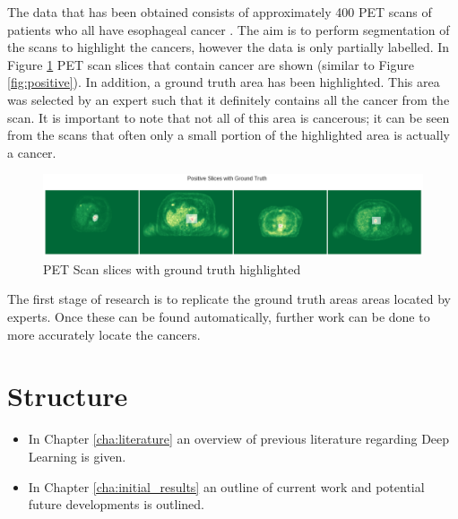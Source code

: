 The data that has been obtained consists of approximately 400 PET scans of patients who all have esophageal cancer \cite{Enzinger_Mayer_2003}.
The aim is to perform segmentation of the scans to highlight the cancers, however the data is only partially labelled.
In Figure \ref{fig:ground_truth} PET scan slices that contain cancer are shown (similar to Figure \ref{fig:positive}).
In addition, a ground truth area has been highlighted.
This area was selected by an expert such that it definitely contains all the cancer from the scan.
It is important to note that not all of this area is cancerous; it can be seen from the scans that often only a small portion of the highlighted area is actually a cancer.

\begin{figure}[hbtp!]
    \centering
    \includegraphics[width=\textwidth]{./img/ground_truth.png}
    \caption{PET Scan slices with ground truth highlighted}
    \label{fig:ground_truth}
\end{figure}

The first stage of research is to replicate the ground truth areas areas located by experts.
Once these can be found automatically, further work can be done to more accurately locate the cancers.

\section{Structure}\label{sec:structure}

\begin{itemize}
    \item In Chapter \ref{cha:literature} an overview of previous literature regarding Deep Learning is given.
    \item In Chapter \ref{cha:initial_results} an outline of current work and potential future developments is outlined.
\end{itemize}